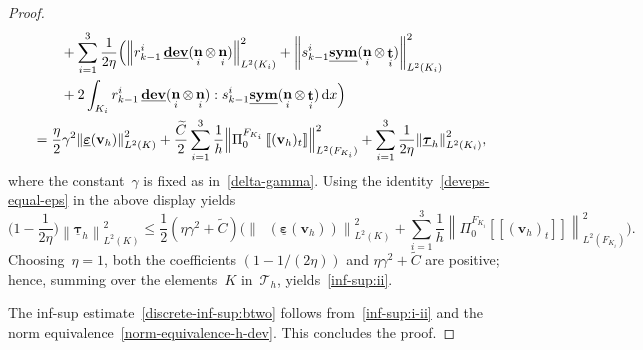 \documentclass[10pt,a4paper]{amsart}
\newcommand{\Ctilde}{\widetilde{C}}
\newcommand{\F}{F}
\newcommand{\Fi}{{\F_{\Ki}}}
\newcommand{\K}{K}
\newcommand{\Ki}{{\K_i}}
\newcommand{\Ltwo}{L^2}
\newcommand{\Norm}[1]{{\left\|{#1} \right\|}}
\newcommand{\PizFi}{\Pi_0^{\Fi}}
\newcommand{\Tauh}{\mathcal{T}_h}
\DeclareMathOperator{\dev}{\underline{\mathbf{dev}}}
\newcommand{\dx}{\, \mathrm{d}x}
\newcommand{\epsbfun}{\underline{\boldsymbol{\varepsilon}}}
\newcommand{\jump}[1]{\left[\!\left[#1\right]\!\right]}
\DeclareMathOperator{\norm}{\bf{n}}
\newcommand{\normi}{\norm_i}
\newcommand{\rkmoi}{r_{k-1}^i}
\newcommand{\skmoi}{s_{k-1}^i}
\newcommand{\sym}{\underline{\bf{sym}}}
\DeclareMathOperator{\tang}{\bf{t}}
\newcommand{\tangi}{\tang_i}
\newcommand{\tangscalar}{t}
\newcommand{\taubfh}{\underline{\boldsymbol{\tau}}_h}
\newcommand{\vbfh}{\mathbf{v}_h}
\begin{document}
\begin{proof}
\begin{equation*}
\begin{split}
&\qquad    + \sum_{i=1}^3 \frac{1}{2\eta}\Big(
            \Norm{\rkmoi \dev(\normi\otimes\normi)}^2_{\Ltwo(\Ki)}
          + \Norm{\skmoi \sym(\normi\otimes\tangi)}^2_{\Ltwo(\Ki)} \\
&\qquad   + 2\int_{\Ki} \rkmoi \dev(\normi\otimes\normi) : \skmoi \sym(\normi\otimes\tangi) \dx\Big) \\ 
&= \frac{\eta}{2}\gamma^2\Norm{\epsbfun(\vbfh)}^2_{\Ltwo(\K)}
    + \frac{\Ctilde}{2} \sum_{i=1}^3 \frac{1}{h} \Norm{\PizFi\jump{(\vbfh)_{\tangscalar}}}^2_{\Ltwo(\Fi)}
    + \sum_{i=1}^3 \frac{1}{2\eta}\Norm{\taubfh}^2_{\Ltwo(\Ki)},
\end{split}
\end{equation*}
where the constant~$\gamma$ is fixed as in~\eqref{delta-gamma}.
Using the identity~\eqref{deveps-equal-eps}
in the above display
yields
\begin{equation*} \label{upper-bound-taubfh}
\big(1-\frac{1}{2\eta}\big) \Norm{\taubfh}_{\Ltwo(\K)}^2
\leq \frac12(\eta\gamma^2 + \Ctilde) \Big(\Norm{\dev(\epsbfun(\vbfh))}_{\Ltwo(\K)}^2 + \sum_{i=1}^3 \frac{1}{h}\Norm{\PizFi\jump{(\vbfh)_{\tangscalar}}}^2_{\Ltwo(\Fi)}\Big).
\end{equation*}
Choosing~$\eta = 1$,
both the coefficients
$(1-1/(2\eta))$ and $\eta\gamma^2 + \Ctilde$ are positive;
hence,
summing over the elements~$\K$ in~$\Tauh$,
yields~\eqref{inf-sup:ii}.

The inf-sup estimate~\eqref{discrete-inf-sup:btwo}
follows from~\eqref{inf-sup:i-ii} and
the norm equivalence~\eqref{norm-equivalence-h-dev}.
This concludes the proof.
\end{proof}
\end{document}
